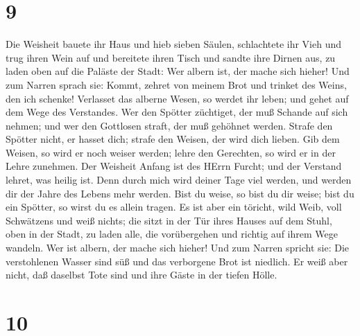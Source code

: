 \hypertarget{section-8}{%
\section{9}\label{section-8}}

 Die Weisheit bauete ihr Haus und hieb sieben Säulen,
 schlachtete ihr Vieh und trug ihren Wein auf und bereitete
ihren Tisch  und sandte ihre Dirnen aus, zu laden oben auf
die Paläste der Stadt:  Wer albern ist, der mache sich
hieher! Und zum Narren sprach sie:  Kommt, zehret von meinem
Brot und trinket des Weins, den ich schenke!  Verlasset das
alberne Wesen, so werdet ihr leben; und gehet auf dem Wege des
Verstandes.  Wer den Spötter züchtiget, der muß Schande auf
sich nehmen; und wer den Gottlosen straft, der muß gehöhnet werden.
 Strafe den Spötter nicht, er hasset dich; strafe den
Weisen, der wird dich lieben.  Gib dem Weisen, so wird er
noch weiser werden; lehre den Gerechten, so wird er in der Lehre
zunehmen.  Der Weisheit Anfang ist des HErrn Furcht; und
der Verstand lehret, was heilig ist.  Denn durch mich wird
deiner Tage viel werden, und werden dir der Jahre des Lebens mehr
werden.  Bist du weise, so bist du dir weise; bist du ein
Spötter, so wirst du es allein tragen.  Es ist aber ein
töricht, wild Weib, voll Schwätzens und weiß nichts;  die
sitzt in der Tür ihres Hauses auf dem Stuhl, oben in der Stadt,
 zu laden alle, die vorübergehen und richtig auf ihrem Wege
wandeln.  Wer ist albern, der mache sich hieher! Und zum
Narren spricht sie:  Die verstohlenen Wasser sind süß und
das verborgene Brot ist niedlich.  Er weiß aber nicht, daß
daselbst Tote sind und ihre Gäste in der tiefen Hölle.

\hypertarget{section-9}{%
\section{10}\label{section-9}}


